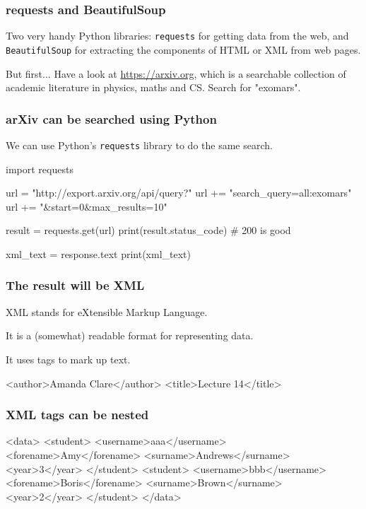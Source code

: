 \documentclass{beamer}
\begin{document}
\begin{frame}[fragile]
\frametitle{requests and BeautifulSoup}
Two very handy Python libraries: \texttt{requests} for getting data
from the web, and \texttt{BeautifulSoup} for extracting the components
of HTML or XML from web pages.

\bigskip

But first... Have a look at \url{https://arxiv.org}, which is a searchable
collection of academic literature in physics, maths and CS.  Search
for "exomars".
\end{frame}

\begin{frame}[fragile]
\frametitle{arXiv can be searched using Python}
We can use Python's \texttt{requests} library to do the same search.
\begin{code}
import requests

url = "http://export.arxiv.org/api/query?" 
url += "search_query=all:exomars" 
url += "&start=0&max_results=10"

result = requests.get(url)
print(result.status_code) # 200 is good

xml_text = response.text
print(xml_text)
\end{code}
\end{frame}

\begin{frame}[fragile]
\frametitle{The result will be XML}
XML stands for eXtensible Markup Language.

It is a (somewhat) readable format for representing data.

It uses tags to mark up text.

\bigskip

\begin{code}
<author>Amanda Clare</author>
<title>Lecture 14</title>
\end{code} 
\end{frame}

\begin{frame}[fragile]
\frametitle{XML tags can be nested}

\begin{code}
<data>
    <student>
        <username>aaa</username>
        <forename>Amy</forename>
        <surname>Andrews</surname>
        <year>3</year>
    </student>
    <student>
        <username>bbb</username>
        <forename>Boris</forename>
        <surname>Brown</surname>
        <year>2</year>
    </student>
</data>\end{code} 
\end{frame}
\end{document}
